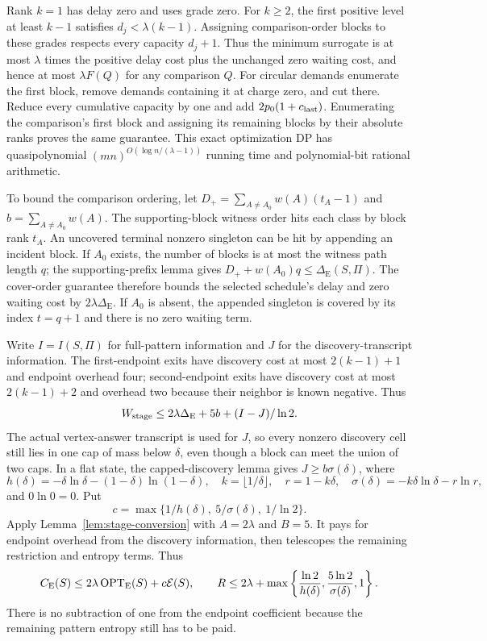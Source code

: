Rank $k=1$ has delay zero and uses grade zero. For $k\ge2$, the
first positive level at least $k-1$ satisfies $d_j<\lambda(k-1)$.
Assigning comparison-order
blocks to these grades respects every capacity $d_j+1$. Thus the
minimum surrogate is at most $\lambda$ times the positive delay
cost plus the unchanged zero waiting cost, and hence at most
$\lambda F(Q)$ for any comparison $Q$. For circular demands
enumerate the first block, remove demands containing it at charge
zero, and cut there. Reduce every cumulative capacity by one and add
$2p_0(1+c_{\rm last})$. Enumerating the comparison's first block
and assigning its remaining blocks by their absolute ranks proves
the same guarantee.
This exact optimization DP has quasipolynomial
$(mn)^{O(\log n/(\lambda-1))}$ running time and polynomial-bit rational
arithmetic.

To bound the comparison ordering, let
$D_+=\sum_{A\ne A_0}w(A)(t_A-1)$ and
$b=\sum_{A\ne A_0}w(A)$. The supporting-block witness order hits
each class by block rank $t_A$. An uncovered terminal nonzero
singleton can be hit by appending an incident block. If $A_0$
exists, the number of blocks is at most the witness path length $q$;
the supporting-prefix lemma gives
$D_++w(A_0)q\le\Delta_{\mathrm E}(S,\Pi)$. The cover-order guarantee
therefore bounds the selected schedule's delay and zero waiting
cost by $2\lambda\Delta_{\mathrm E}$. If $A_0$ is absent, the
appended singleton is covered by its index $t=q+1$ and there is
no zero waiting term.

Write $I=I(S,\Pi)$ for full-pattern information and $J$ for the
discovery-transcript information. The first-endpoint exits have
discovery cost at most $2(k-1)+1$ and endpoint overhead four;
second-endpoint exits have discovery cost at most $2(k-1)+2$ and
overhead two because their neighbor is known negative. Thus
\[
 W_{\rm stage}\le2\lambda\Delta_{\mathrm E}
 +5b+(I-J)/\ln2.
\]
The actual vertex-answer transcript is used for $J$, so every
nonzero discovery cell still lies in one cap of mass below $\delta$,
even though a block can meet the union of two caps.
In a flat state, the capped-discovery lemma gives $J\ge b\sigma(\delta)$,
where
\[
 h(\delta)=-\delta\ln\delta-(1-\delta)\ln(1-\delta),\quad
 k=\lfloor1/\delta\rfloor,\quad r=1-k\delta,\quad
 \sigma(\delta)=-k\delta\ln\delta-r\ln r,
\]
and $0\ln0=0$. Put
\[
 c=\max\{1/h(\delta),\ 5/\sigma(\delta),\ 1/\ln2\}.
\]
Apply Lemma~\ref{lem:stage-conversion} with $A=2\lambda$ and
$B=5$. It pays for endpoint overhead from the discovery information,
then telescopes the remaining restriction and entropy terms. Thus
\begin{equation}\label{eq:qp-expected-ratio}
 C_{\mathrm E}(S)\le2\lambda\operatorname{OPT}_{\mathrm E}(S)+c\mathcal E(S),\qquad
 R\le2\lambda+\max\left\{\frac{\ln2}{h(\delta)},
 \frac{5\ln2}{\sigma(\delta)},1\right\}.
\end{equation}
There is no subtraction of one from the endpoint coefficient because
the remaining pattern entropy still has to be paid.

